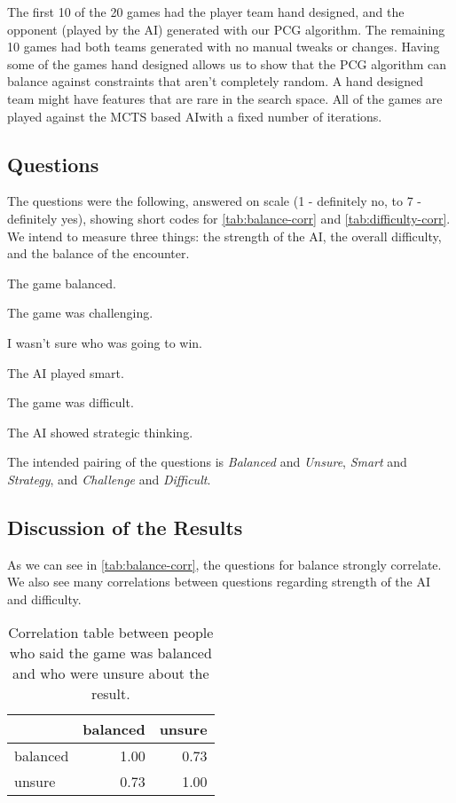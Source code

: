 The first 10 of the 20 games had the player team hand designed, and the
opponent (played by the AI) generated with our PCG algorithm. The remaining 10
games had both teams generated with no manual tweaks or changes. Having some of
the games hand designed allows us to show that the PCG algorithm can balance
against constraints that aren't completely random. A hand designed team might
have features that are rare in the search space. All of the games are played
against the MCTS based AI\@ with a fixed number of iterations.

\subsection{Questions}

The questions were the following, answered on scale (1 - definitely no, to 7 - definitely yes), showing short codes for \autoref{tab:balance-corr} and \autoref{tab:difficulty-corr}. We intend to measure three things: the strength of the AI, the overall difficulty, and the balance of the encounter.

\begin{description}[]
	\item[Balanced:] The game balanced.
	\item[Challenge:] The game was challenging.
	\item[Unsure:] I wasn't sure who was going to win.
	\item[Smart:] The AI played smart.
	\item[Difficult:] The game was difficult.
	\item[Strategy:] The AI showed strategic thinking.
\end{description}

The intended pairing of the questions is \emph{Balanced} and \emph{Unsure}, \emph{Smart} and \emph{Strategy}, and \emph{Challenge} and \emph{Difficult}.

\subsection{Discussion of the Results}

As we can see in \autoref{tab:balance-corr}, the questions for balance strongly correlate. We also see many correlations between questions regarding strength of the AI and difficulty.

\begin{table}[h]
	\centering
	\begin{tabular}{lrr}
		\toprule
		{} &  balanced &  unsure \\
		\midrule
		balanced &      1.00 &    \cellcolor{blue!25}0.73 \\
		unsure   &      \cellcolor{blue!25}0.73 &    1.00 \\
		\bottomrule
	\end{tabular}
	\caption{Correlation table between people who said the game was balanced and who were unsure about the result.}	
	\label{tab:balance-corr}
\end{table}

